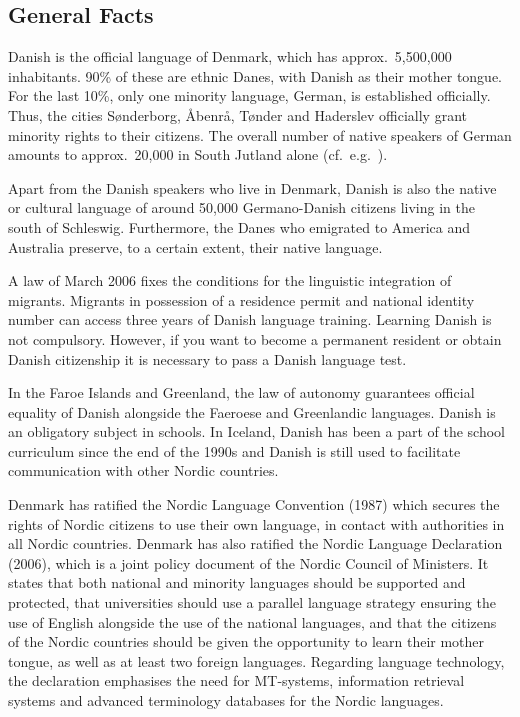 \documentclass[]{../../metanetpaper}
\begin{document}
\begin{multicols}{2}

\subsection{General Facts}


Danish is the official language of Denmark, which has approx.\ 5,500,000 inhabitants. 90\% of these are ethnic Danes, with Danish as their mother tongue. For the last 10\%, only one minority language, German, is established officially. Thus, the cities S\o nderborg, \mbox{\AA benr\aa}, T\o nder and Haderslev officially grant minority rights to their citizens. The overall number of native speakers of German amounts to approx.\ 20,000 in South Jutland alone (cf.\ e.g.\ \cite{Danmark}).  

Apart from the Danish speakers who live in Denmark, Danish is also the native or cultural language of around 50,000 Germano-Danish citizens living in the south of Schleswig. Furthermore, the Danes who emigrated to America and Australia preserve, to a certain extent, their native language.

A law of March 2006 fixes the conditions for the linguistic integration of migrants. Migrants in possession of a residence permit and national identity number can access three years of Danish language training. Learning Danish is not compulsory. However, if you want to become a permanent resident or obtain Danish citizenship it is necessary to pass a Danish language test.

In the Faroe Islands and Greenland, the law of autonomy guarantees official equality of Danish alongside the Faeroese and Greenlandic languages. Danish is an obligatory subject in schools. In Iceland, Danish has been a part of the school curriculum since the end of the 1990s and Danish is still used to facilitate communication with other Nordic countries. 

Denmark has ratified the Nordic Language Convention (1987) which secures the rights of Nordic citizens to use their own language, in contact with authorities in all Nordic countries.  Denmark has also ratified the Nordic Language Declaration (2006), which is a joint policy document of the Nordic Council of Ministers. It states that both national and minority languages should be supported and protected, that universities should use a parallel language strategy ensuring the use of English alongside the use of the national languages, and that the citizens of the Nordic countries should be given the opportunity to learn their mother tongue, as well as at least two foreign languages.  Regarding language technology, the declaration emphasises the need for MT-systems, information retrieval systems and advanced terminology databases for the Nordic languages.


\end{multicols}
\end{document}
